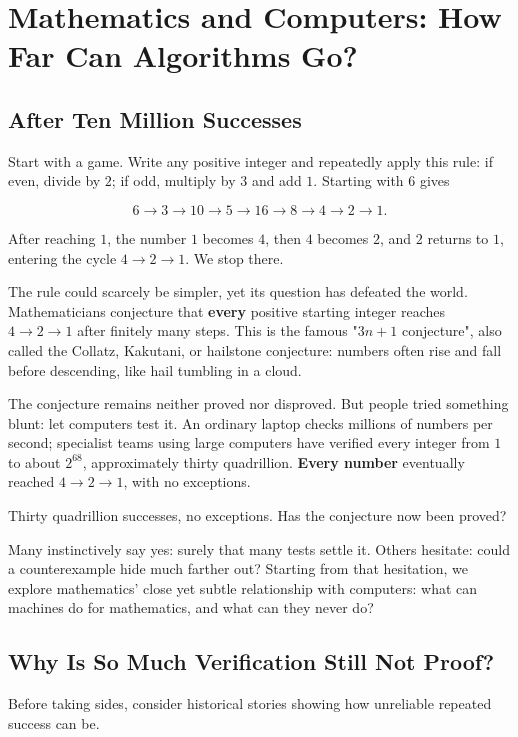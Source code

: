 \chapter{Mathematics and Computers: How Far Can Algorithms Go?}

\section{After Ten Million Successes}

Start with a game. Write any positive integer and repeatedly apply this rule: if even, divide by $2$; if odd, multiply by $3$ and add $1$. Starting with $6$ gives

\[6 \to 3 \to 10 \to 5 \to 16 \to 8 \to 4 \to 2 \to 1.\]

After reaching $1$, the number $1$ becomes $4$, then $4$ becomes $2$, and $2$ returns to $1$, entering the cycle $4 \to 2 \to 1$. We stop there.

The rule could scarcely be simpler, yet its question has defeated the world. Mathematicians conjecture that \textbf{every} positive starting integer reaches $4 \to 2 \to 1$ after finitely many steps. This is the famous "$3n+1$ conjecture", also called the Collatz, Kakutani, or hailstone conjecture: numbers often rise and fall before descending, like hail tumbling in a cloud.

The conjecture remains neither proved nor disproved. But people tried something blunt: let computers test it. An ordinary laptop checks millions of numbers per second; specialist teams using large computers have verified every integer from $1$ to about $2^{68}$, approximately thirty quadrillion. \textbf{Every number} eventually reached $4 \to 2 \to 1$, with no exceptions.

Thirty quadrillion successes, no exceptions. Has the conjecture now been proved?

Many instinctively say yes: surely that many tests settle it. Others hesitate: could a counterexample hide much farther out? Starting from that hesitation, we explore mathematics' close yet subtle relationship with computers: what can machines do for mathematics, and what can they never do?

\section{Why Is So Much Verification Still Not Proof?}

Before taking sides, consider historical stories showing how unreliable repeated success can be.

